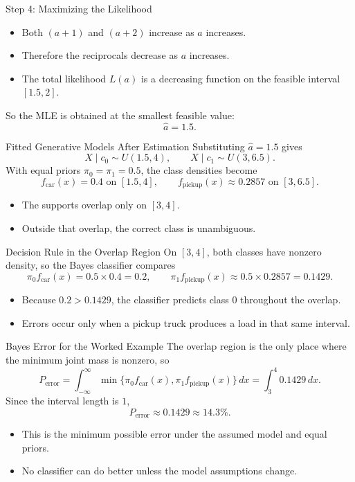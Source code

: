 \documentclass[10pt]{beamer}
\begin{document}
\begin{frame}{Step 4: Maximizing the Likelihood}
  \justifying
  \begin{itemize}
    \item Both $(a+1)$ and $(a+2)$ increase as $a$ increases.
    \item Therefore the reciprocals decrease as $a$ increases.
    \item The total likelihood $L(a)$ is a decreasing function on the feasible interval $[1.5,2]$.
  \end{itemize}
  So the MLE is obtained at the smallest feasible value:
  \[
    \hat{a} = 1.5.
  \]
\end{frame}

\begin{frame}{Fitted Generative Models After Estimation}
  \justifying
  Substituting $\hat{a}=1.5$ gives
  \[
    X\mid c_0 \sim U(1.5,4),
    \qquad
    X\mid c_1 \sim U(3,6.5).
  \]
  With equal priors $\pi_0=\pi_1=0.5$, the class densities become
  \[
    f_{\text{car}}(x)=0.4 \text{ on } [1.5,4],
    \qquad
    f_{\text{pickup}}(x)\approx 0.2857 \text{ on } [3,6.5].
  \]
  \begin{itemize}
    \item The supports overlap only on $[3,4]$.
    \item Outside that overlap, the correct class is unambiguous.
  \end{itemize}
\end{frame}

\begin{frame}{Decision Rule in the Overlap Region}
  \justifying
  On $[3,4]$, both classes have nonzero density, so the Bayes classifier compares
  \[
    \pi_0 f_{\text{car}}(x) = 0.5 \times 0.4 = 0.2,
    \qquad
    \pi_1 f_{\text{pickup}}(x) \approx 0.5 \times 0.2857 = 0.1429.
  \]
  \begin{itemize}
    \item Because $0.2 > 0.1429$, the classifier predicts class $0$ throughout the overlap.
    \item Errors occur only when a pickup truck produces a load in that same interval.
  \end{itemize}
\end{frame}

\begin{frame}{Bayes Error for the Worked Example}
  \justifying
  The overlap region is the only place where the minimum joint mass is nonzero, so
  \[
    P_{\text{error}} = \int_{-\infty}^{\infty} \min\{\pi_0f_{\text{car}}(x),\pi_1f_{\text{pickup}}(x)\}\,dx
    = \int_3^4 0.1429\,dx.
  \]
  Since the interval length is $1$,
  \[
    P_{\text{error}} \approx 0.1429 \approx 14.3\%.
  \]
  \begin{itemize}
    \item This is the minimum possible error under the assumed model and equal priors.
    \item No classifier can do better unless the model assumptions change.
  \end{itemize}
\end{frame}
\end{document}
